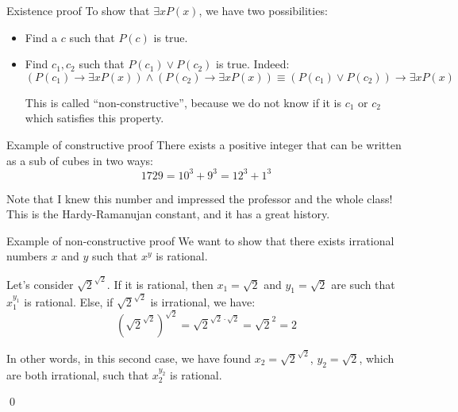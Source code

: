 \documentclass{article}
\begin{document}
\begin{parag}{Existence proof}
    To show that $\exists x P\left(x\right)$, we have two possibilities: 
    \begin{itemize}[left=0pt]
        \item {} Find a $c$ such that $P\left(c\right)$ is true. 
        \item {} Find $c_1, c_2$ such that $P\left(c_1\right) \lor P\left(c_2\right)$ is true. Indeed:
            \[\left(P\left(c_1\right) \to \exists x P\left(x\right)\right) \land \left(P\left(c_2\right) \to \exists x P\left(x\right)\right) \equiv \left(P\left(c_1\right) \lor P\left(c_2\right)\right) \to \exists x P\left(x\right)\]
        
       This is called ``non-constructive'', because we do not know if it is $c_1$ or $c_2$ which satisfies this property.
    \end{itemize}


    \begin{subparag}{Example of constructive proof}
        There exists a positive integer that can be written as a sub of cubes in two ways: 
        \[1729 = 10^3 + 9^3 = 12^3 + 1^3\]
        
        Note that I knew this number and impressed the professor and the whole class! \smiley This is the Hardy-Ramanujan constant, and it has a great history.
    \end{subparag}

    \begin{subparag}{Example of non-constructive proof}
        We want to show that there exists irrational numbers $x$ and $y$ such that $x^{y}$ is rational. 

        Let's consider $\sqrt{2}^{\sqrt{2}}$. If it is rational, then $x_1 = \sqrt{2}$ and $y_1 = \sqrt{2}$ are such that $x_1^{y_1}$ is rational. Else, if $\sqrt{2}^{\sqrt{2}}$ is irrational, we have:
        \[\left(\sqrt{2}^{\sqrt{2}}\right)^{\sqrt{2}} = \sqrt{2}^{\sqrt{2} \cdot \sqrt{2}} = \sqrt{2}^2 = 2\]

        In other words, in this second case, we have found $x_2 = \sqrt{2}^{\sqrt{2}}$, $y_2 = \sqrt{2}$, which are both irrational, such that  $x_2^{y_2}$ is rational.

        \qed
    \end{subparag}
    
    
\end{parag}
\end{document}
